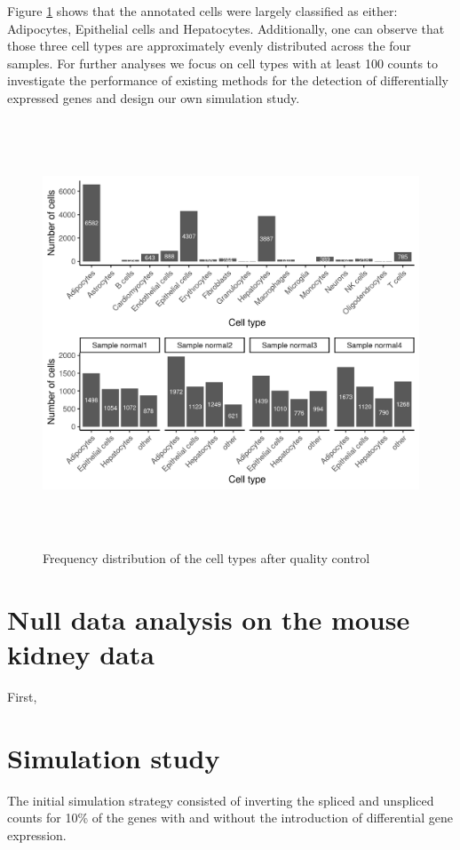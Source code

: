 Figure \ref{fig:mouse_cell_type} shows that the annotated cells were largely classified as either: Adipocytes, Epithelial cells and Hepatocytes. Additionally, one can observe that those three cell types are approximately evenly distributed across the four samples. For further analyses we focus on cell types with at least 100 counts to investigate the performance of existing methods for the detection of differentially expressed genes and design our own simulation study.

\begin{figure}[!htb]
\begin{center}
\includegraphics[width=6in,height=5in]{figure/kidney_mouse/cell_type_distribution.png}
\end{center}
\caption{Frequency distribution of the cell types after quality control} 
\label{fig:mouse_cell_type}
\end{figure}
\FloatBarrier

\section{Null data analysis on the mouse kidney data}
First,

\section{Simulation study}
The initial simulation strategy consisted of inverting the spliced and unspliced counts for 10\% of the genes with and without the introduction of differential gene expression. 

